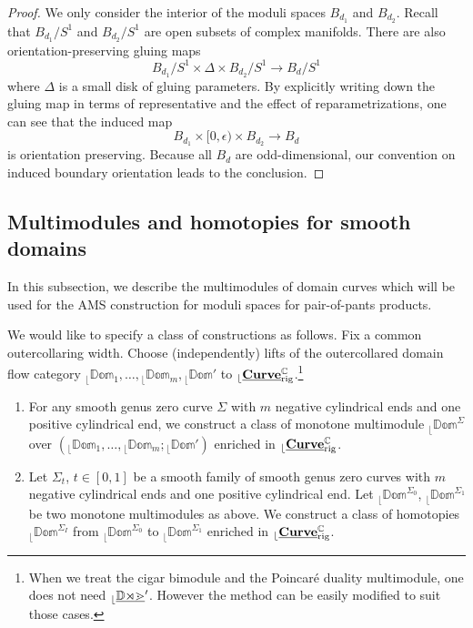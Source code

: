 \documentclass[reqno, 10pt]{amsart}
\numberwithin{equation}{section}
\numberwithin{equation}{section}
\theoremstyle{definition}
\theoremstyle{remark}
\newcommand{\beqn}{\begin{equation*}}
\newcommand{\eeqn}{\end{equation*}}
\newcommand{\mb}{\mathbb}
\renewcommand{\outer}{{}_{\lfloor}}
\newcommand{\uds}[1]{\underline{\smash{#1}}}
\begin{document}
\begin{proof}
We only consider the interior of the moduli spaces $B_{d_1}$ and $B_{d_2}$. Recall that $B_{d_1}/S^1$ and $B_{d_2}/S^1$ are open subsets of complex manifolds. There are also orientation-preserving gluing maps
\beqn
B_{d_1}/S^1 \times \Delta \times B_{d_2}/S^1 \to B_d/S^1
\eeqn
where $\Delta$ is a small disk of gluing parameters. By explicitly writing down the gluing map in terms of representative and the effect of reparametrizations, one can see that the induced map
\beqn
B_{d_1}\times [0, \epsilon) \times B_{d_2} \to B_d
\eeqn
is orientation preserving. Because all $B_d$ are odd-dimensional, our convention on induced boundary orientation leads to the conclusion.
\end{proof}






\subsection{Multimodules and homotopies for smooth domains}\label{subsection_domain_multimodule}


In this subsection, we describe the multimodules of domain curves which will be used for the AMS construction for moduli spaces for pair-of-pants products. 

We would like to specify a class of constructions as follows. Fix a common outercollaring width. Choose (independently) lifts of the outercollared domain flow category $\outer \mb{Dom}_1, \ldots, \outer \mb{Dom}_m, \outer \mb{Dom}'$ to $\outer \uds{\bf Curve}_{\rm rig}^{\mb C}$.\footnote{When we treat the cigar bimodule and the Poincar\'e duality multimodule, one does not need $\outer \uds{\mb{Dom}}'$. However the method can be easily modified to suit those cases.}

\begin{enumerate}
    \item For any smooth genus zero curve $\Sigma$ with $m$ negative cylindrical ends and one positive cylindrical end, we construct a class of monotone multimodule $\outer \mb{Dom}^\Sigma$ over $(\outer \mb{Dom}_1, \ldots, \outer \mb{Dom}_m; \outer \mb{Dom}')$ enriched in $\outer \uds{\bf Curve}_{\rm rig}^{\mb C}$.

    \item Let $\Sigma_t$, $t \in [0, 1]$ be a smooth family of smooth genus zero curves with $m$ negative cylindrical ends and one positive cylindrical end. Let $\outer \mb{Dom}^{\Sigma_0}$, $\outer \mb{Dom}^{\Sigma_1}$ be two monotone multimodules as above. We construct a class of homotopies $\outer \mb{Dom}^{\Sigma_I}$ from $\outer \mb{Dom}^{\Sigma_0}$ to $\outer \mb{Dom}^{\Sigma_1}$ enriched in $\outer \uds{\bf Curve}_{\rm rig}^{\mb C}$.    
    \end{enumerate}
\end{document}
